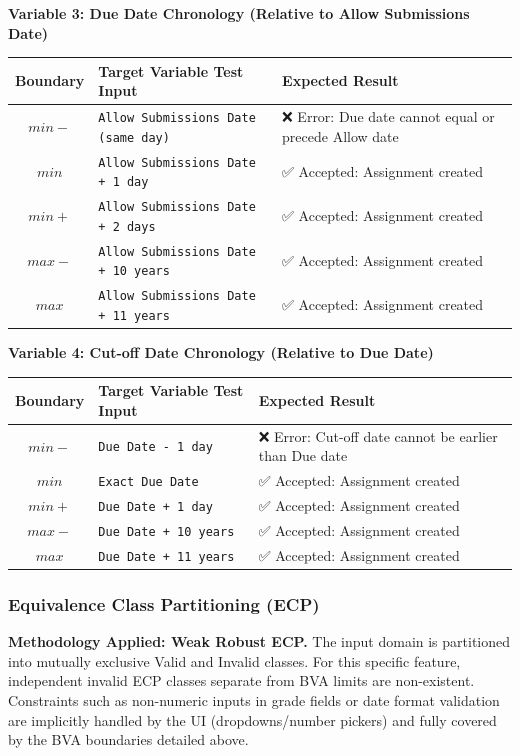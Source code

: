 \documentclass[twoside,final]{hcmut-report}
\begin{document}
\vspace{0.3cm}
\noindent\textbf{Variable 3: Due Date Chronology (Relative to Allow Submissions Date)}
\begin{table}[H]
\centering
\renewcommand{\arraystretch}{1.2}
\begin{tabularx}{\textwidth}{|c|l|X|}
\hline
\textbf{Boundary} & \textbf{Target Variable Test Input} & \textbf{Expected Result} \\ \hline
$min-$ & \texttt{Allow Submissions Date (same day)} & ❌ Error: Due date cannot equal or precede Allow date \\ \hline
$min$ & \texttt{Allow Submissions Date + 1 day} & ✅ Accepted: Assignment created \\ \hline
$min+$ & \texttt{Allow Submissions Date + 2 days} & ✅ Accepted: Assignment created \\ \hline
$max-$ & \texttt{Allow Submissions Date + 10 years} & ✅ Accepted: Assignment created \\ \hline
$max$ & \texttt{Allow Submissions Date + 11 years} & ✅ Accepted: Assignment created \\ \hline
\end{tabularx}
\end{table}

\vspace{0.3cm}
\noindent\textbf{Variable 4: Cut-off Date Chronology (Relative to Due Date)}
\begin{table}[H]
\centering
\renewcommand{\arraystretch}{1.2}
\begin{tabularx}{\textwidth}{|c|l|X|}
\hline
\textbf{Boundary} & \textbf{Target Variable Test Input} & \textbf{Expected Result} \\ \hline
$min-$ & \texttt{Due Date - 1 day} & ❌ Error: Cut-off date cannot be earlier than Due date \\ \hline
$min$ & \texttt{Exact Due Date} & ✅ Accepted: Assignment created \\ \hline
$min+$ & \texttt{Due Date + 1 day} & ✅ Accepted: Assignment created \\ \hline
$max-$ & \texttt{Due Date + 10 years} & ✅ Accepted: Assignment created \\ \hline
$max$ & \texttt{Due Date + 11 years} & ✅ Accepted: Assignment created \\ \hline
\end{tabularx}
\end{table}

\subsubsection{Equivalence Class Partitioning (ECP)}
\textbf{Methodology Applied: Weak Robust ECP.}
The input domain is partitioned into mutually exclusive Valid and Invalid classes. For this specific feature, independent invalid ECP classes separate from BVA limits are non-existent. Constraints such as non-numeric inputs in grade fields or date format validation are implicitly handled by the UI (dropdowns/number pickers) and fully covered by the BVA boundaries detailed above.
\end{document}
